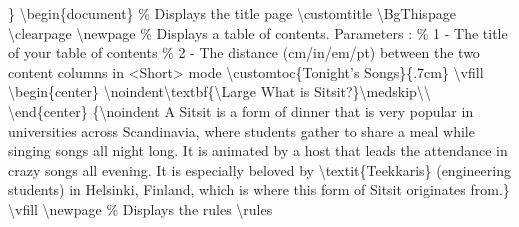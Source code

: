 \documentclass{article}%
\begin{document}
\}\newline%
\newline%
\textbackslash{}begin\{document\}\newline%
\newline%
\% Displays the title page\newline%
\textbackslash{}customtitle\newline%
\textbackslash{}BgThispage\newline%
\textbackslash{}clearpage\newline%
\newline%
\textbackslash{}newpage\newline%
\newline%
\% Displays a table of contents. Parameters :\newline%
\% 1 {-} The title of your table of contents\newline%
\% 2 {-} The distance (cm/in/em/pt) between the two content columns in <Short> mode\newline%
\textbackslash{}customtoc\{Tonight's Songs\}\{.7cm\}\newline%
\newline%
\textbackslash{}vfill\newline%
\newline%
\textbackslash{}begin\{center\}\newline%
\textbackslash{}noindent\textbackslash{}textbf\{\textbackslash{}Large What is Sitsit?\}\textbackslash{}medskip\textbackslash{}\textbackslash{}\newline%
\textbackslash{}end\{center\}\newline%
\newline%
\{\textbackslash{}noindent A Sitsit is a form of dinner that is very popular in universities across Scandinavia, where students gather to share a meal while singing songs all night long. It is animated by a host that leads the attendance in crazy songs all evening. It is especially beloved by \textbackslash{}textit\{Teekkaris\} (engineering students) in Helsinki, Finland, which is where this form of Sitsit originates from.\}\newline%
\newline%
\textbackslash{}vfill\newline%
\textbackslash{}newpage\newline%
\newline%
\% Displays the rules\newline%
\textbackslash{}rules\newline%
\newline%
\end{document}
